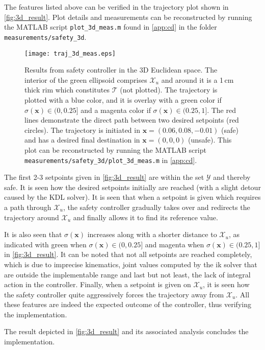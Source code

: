 The features listed above can be verified in the trajectory plot shown in \autoref{fig:3d_result}. Plot details and measurements  can be reconstructed by running the MATLAB script \texttt{plot\_3d\_meas.m} found in \autoref{app:cd} in the folder \texttt{measurements/safety\_3d}.
\begin{figure}[h]
\hspace{-45mm}
	\texttt{[image: traj\_3d\_meas.eps]}
	\caption{Results from safety controller in the 3D Euclidean space. The interior of the green ellipsoid comprises $\mathcal{X}_u$ and around it is a 1\,cm thick rim which constitutes $\mathcal{T}$ (not plotted). The trajectory is plotted with a blue color, and it is overlay with a green color if $\sigma(\textbf{x}) \in (0,0.25]$ and a magenta color if $\sigma(\textbf{x}) \in (0.25,1]$. The red lines demonstrate the direct path between two desired setpoints (red circles). The trajectory is initiated in $\mathbf{x}=(0.06,0.08,-0.01)$ (safe) and has a desired final destination in $\mathbf{x}=(0,0,0)$ (unsafe). This plot can be reconstructed by running the MATLAB script \texttt{measurements/safety\_3d/plot\_3d\_meas.m} in \autoref{app:cd}.}
	\label{fig:3d_result}
\end{figure}
The first 2-3 setpoints given in \autoref{fig:3d_result} are within the set $\mathcal{Y}$ and thereby safe. It is seen how the desired setpoints initially are reached (with a slight detour caused by the KDL solver). It is seen that when a setpoint is given which requires a path through $\mathcal{X}_u$, the safety controller gradually takes over and redirects the trajectory around $\mathcal{X}_u$ and finally allows it to find its reference value. 

It is also seen that $\sigma(\textbf{x})$ increases along with a shorter distance to $\mathcal{X}_u$, as indicated with green when $\sigma (\textbf{x}) \in (0,0.25]$ and magenta  when $\sigma (\textbf{x}) \in (0.25,1]$ in \autoref{fig:3d_result}. It can be noted that not all setpoints are reached completely, which is due to imprecise kinematics, joint values computed by the \gls{ik} solver that are outside the implementable range and last but not least, the lack of integral action in the controller. Finally, when a setpoint is given on $\mathcal{X}_u$, it is seen how the safety controller quite aggressively forces the trajectory away from $\mathcal{X}_u$. All these features are indeed the expected outcome of the controller, thus verifying the implementation. 

The result depicted in \autoref{fig:3d_result} and its associated analysis concludes the implementation.

